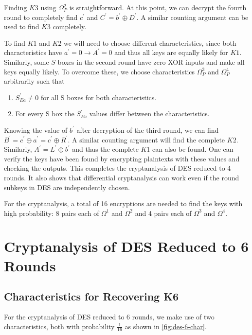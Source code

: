 \documentclass[twoside]{article}
\begin{document}
Finding \(K3\) using \(\Omega_P^2\) is straightforward. At this point, we can
decrypt the fourth round to completely find \(c^\prime\) and \(C^\prime =
b^\prime \oplus D^\prime\). A similar counting argument can be used to find
\(K3\) completely.

To find \(K1\) and \(K2\) we will need to choose different characteristics,
since both characteristics have \(a^\prime = 0 \rightarrow A^\prime = 0\) and
thus all keys are equally likely for \(K1\). Similarly, some \(S\) boxes in the
second round have zero XOR inputs and make all keys equally likely. To overcome
these, we choose characteristics \(\Omega_P^3\) and \(\Omega_P^4\) arbitrarily
such that
\begin{enumerate}
    \item \(S^\prime_{Ea} \neq 0\) for all S boxes for both characteristics.
    \item For every S box the \(S^\prime_{Ea}\) values differ between the
    characteristics.
\end{enumerate}

Knowing the value of \(b^\prime\) after decryption of the third round, we can
find \(B^\prime = c^\prime \oplus a^\prime = c^\prime \oplus R^\prime\). A
similar counting argument will find the complete \(K2\). Similarly, \(A^\prime =
L^\prime \oplus b^\prime\) and thus the complete \(K1\) can also be found. One
can verify the keys have been found by encrypting plaintexts with these values
and checking the outputs. This completes the cryptanalysis of DES reduced to 4
rounds. It also shows that differential cryptanalysis can work even if the round
subkeys in DES are independently chosen.

For the cryptanalysis, a total of 16 encryptions are needed to find the keys
with high probability: 8 pairs each of \(\Omega^1\) and \(\Omega^2\) and 4 pairs
each of \(\Omega^3\) and \(\Omega^4\).

\section{Cryptanalysis of DES Reduced to 6 Rounds}

\subsection{Characteristics for Recovering K6}

For the cryptanalysis of DES reduced to 6 rounds, we make use of two
characteristics, both with probability \(\frac{1}{16}\) as shown in
\autoref{fig:des-6-char}.
\end{document}
